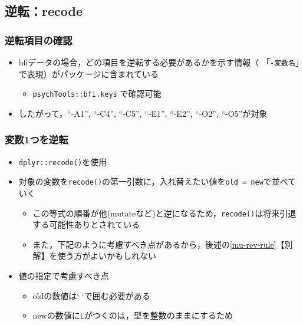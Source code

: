 \documentclass[
  xelatex,ja=standard, b5paper]{bxjsbook}
\providecommand{\tightlist}{%
  \setlength{\itemsep}{0pt}\setlength{\parskip}{0pt}}
\begin{document}
\hypertarget{mu-rev-recode}{%
\subsection{逆転：recode}\label{mu-rev-recode}}

\hypertarget{mu-rev-check}{%
\subsubsection{逆転項目の確認}\label{mu-rev-check}}

\begin{itemize}
\tightlist
\item
  bfiデータの場合，どの項目を逆転する必要があるかを示す情報（
  「\texttt{-変数名}」で表現）がパッケージに含まれている

  \begin{itemize}
  \tightlist
  \item
    \texttt{psychTools::bfi.keys} で確認可能
  \end{itemize}
\item
  したがって，``-A1'', ``-C4'', ``-C5'', ``-E1'', ``-E2'', ``-O2'', ``-O5''が対象
\end{itemize}

\hypertarget{mu-rev-recode1}{%
\subsubsection{変数1つを逆転}\label{mu-rev-recode1}}

\begin{itemize}
\tightlist
\item
  \texttt{dplyr::recode()}を使用
\item
  対象の変数を\texttt{recode()}の第一引数に，入れ替えたい値を\texttt{old\ =\ new}で並べていく

  \begin{itemize}
  \tightlist
  \item
    この等式の順番が他(mutateなど)と逆になるため，\texttt{recode()}は将来引退する可能性ありとされている
  \item
    また，下記のように考慮すべき点があるから，後述の\ref{mu-rev-rule}【別解】を使う方がよいかもしれない
  \end{itemize}
\item
  値の指定で考慮すべき点

  \begin{itemize}
  \tightlist
  \item
    oldの数値は` `で囲む必要がある
  \item
    newの数値に\texttt{L}がつくのは，型を整数のままにするため
  \end{itemize}
\end{itemize}
\end{document}
